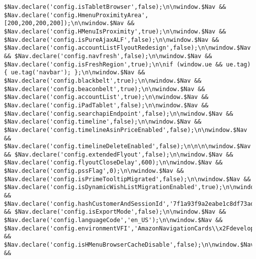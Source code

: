 \documentclass[
]{article}
\begin{document}
\begin{verbatim}
$Nav.declare('config.isTabletBrowser',false);\n\nwindow.$Nav && $Nav.declare('config.HmenuProximityArea',[200,200,200,200]);\n\nwindow.$Nav && $Nav.declare('config.HMenuIsProximity',true);\n\nwindow.$Nav && $Nav.declare('config.isPureAjaxALF',false);\n\nwindow.$Nav && $Nav.declare('config.accountListFlyoutRedesign',false);\n\nwindow.$Nav && $Nav.declare('config.navfresh',false);\n\nwindow.$Nav && $Nav.declare('config.isFreshRegion',true);\n\nif (window.ue && ue.tag) { ue.tag('navbar'); };\n\nwindow.$Nav && $Nav.declare('config.blackbelt',true);\n\nwindow.$Nav && $Nav.declare('config.beaconbelt',true);\n\nwindow.$Nav && $Nav.declare('config.accountList',true);\n\nwindow.$Nav && $Nav.declare('config.iPadTablet',false);\n\nwindow.$Nav && $Nav.declare('config.searchapiEndpoint',false);\n\nwindow.$Nav && $Nav.declare('config.timeline',false);\n\nwindow.$Nav && $Nav.declare('config.timelineAsinPriceEnabled',false);\n\nwindow.$Nav && $Nav.declare('config.timelineDeleteEnabled',false);\n\n\n\nwindow.$Nav && $Nav.declare('config.extendedFlyout',false);\n\nwindow.$Nav && $Nav.declare('config.flyoutCloseDelay',600);\n\nwindow.$Nav && $Nav.declare('config.pssFlag',0);\n\nwindow.$Nav && $Nav.declare('config.isPrimeTooltipMigrated',false);\n\nwindow.$Nav && $Nav.declare('config.isDynamicWishListMigrationEnabled',true);\n\nwindow.$Nav && $Nav.declare('config.hashCustomerAndSessionId','7f1a93f9a2eabe1c8df73ad57d1658e6e3820bb6');\n\nwindow.$Nav && $Nav.declare('config.isExportMode',false);\n\nwindow.$Nav && $Nav.declare('config.languageCode','en_US');\n\nwindow.$Nav && $Nav.declare('config.environmentVFI','AmazonNavigationCards\\x2Fdevelopment\\x40B6097992874\\x2DAL2_x86_64');\n\n\n\nwindow.$Nav && $Nav.declare('config.isHMenuBrowserCacheDisable',false);\n\nwindow.$Nav && 
\end{verbatim}
\end{document}

